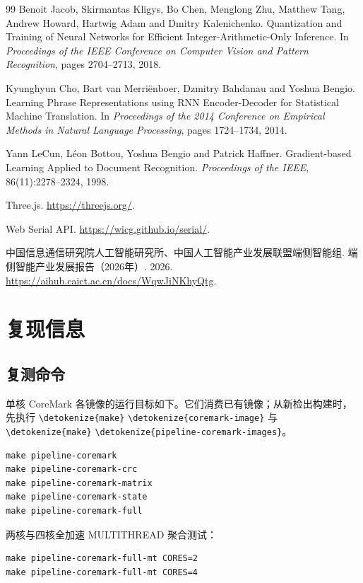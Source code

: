 \documentclass[UTF8,a4paper,12pt,fontset=none,scheme=plain]{ctexart}
\renewcommand{\thesubsection}{\arabic{section}.\arabic{subsection}}
\newcommand{\code}[1]{\texttt{\detokenize{#1}}}
\renewcommand{\code}[1]{{\small\ttfamily\urlstyle{tt}\expandafter\nolinkurl\expandafter{\detokenize{#1}}}}
\begin{document}
\begin{thebibliography}{99}
  Benoit Jacob, Skirmantas Kligys, Bo Chen, Menglong Zhu, Matthew Tang, Andrew Howard,
  Hartwig Adam and Dmitry Kalenichenko. Quantization and Training of Neural Networks for
  Efficient Integer-Arithmetic-Only Inference. In \emph{Proceedings of the IEEE Conference on
  Computer Vision and Pattern Recognition}, pages 2704--2713, 2018.

  Kyunghyun Cho, Bart van Merriënboer, Dzmitry Bahdanau and Yoshua Bengio. Learning Phrase
  Representations using RNN Encoder-Decoder for Statistical Machine Translation. In
  \emph{Proceedings of the 2014 Conference on Empirical Methods in Natural Language Processing},
  pages 1724--1734, 2014.

  Yann LeCun, Léon Bottou, Yoshua Bengio and Patrick Haffner. Gradient-based Learning Applied
  to Document Recognition. \emph{Proceedings of the IEEE}, 86(11):2278--2324, 1998.

  Three.js. \url{https://threejs.org/}.

  Web Serial API. \url{https://wicg.github.io/serial/}.

  中国信息通信研究院人工智能研究所、中国人工智能产业发展联盟端侧智能组.
  端侧智能产业发展报告（2026年）. 2026.
  \url{https://aihub.caict.ac.cn/docs/WqwJiNKhyQtg}.

\end{thebibliography}
\endgroup


\clearpage
\appendix
{}
\renewcommand{\thesubsection}{\Alph{section}.\arabic{subsection}}
\section{复现信息}
\label{app:repro}
\subsection{复测命令}
单核 CoreMark 各镜像的运行目标如下。它们消费已有镜像；从新检出构建时，先执行 \code{make} \code{coremark-image} 与 \code{make} \code{pipeline-coremark-images}。
\begin{lstlisting}[language={}]
make pipeline-coremark
make pipeline-coremark-crc
make pipeline-coremark-matrix
make pipeline-coremark-state
make pipeline-coremark-full
\end{lstlisting}
两核与四核全加速 MULTITHREAD 聚合测试：
\begin{lstlisting}[language={}]
make pipeline-coremark-full-mt CORES=2
make pipeline-coremark-full-mt CORES=4
\end{lstlisting}
\end{document}

